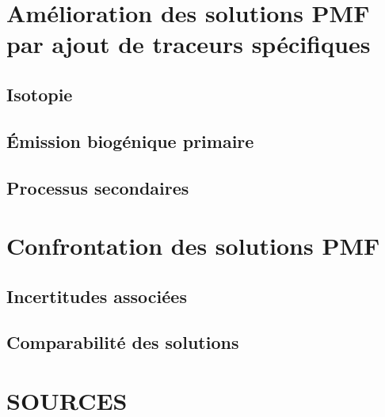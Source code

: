 
\section{Amélioration des solutions PMF par ajout de traceurs spécifiques}%
\label{sec:amélioration_des_solutions_pmf}

\subsection{Isotopie}%
\label{sub:isotopie}

\subsection{Émission biogénique primaire}%
\label{sub:émission_biogénique_primaire}

\subsection{Processus secondaires}%
\label{sub:processus_secondaires}

\section{Confrontation des solutions PMF}%
\label{sec:confrontation_des_solutions_pmf}

\subsection{Incertitudes associées}%
\label{sub:incertitudes_associées}

\subsection{Comparabilité des solutions}%
\label{sub:comparabilité_des_solutions}

\section{SOURCES}%
\label{sec:sources}


